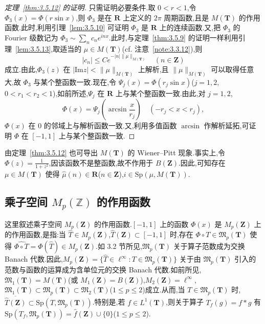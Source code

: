 \begin{proof}[定理~\ref{thm:3.5.12} 的证明]
只需证明必要条件.取 $0 < r < 1$,令 $\Phi_{3}(x) = \Phi(r\sin x)$,则 $\Phi_{3}$ 是在 $\mathbf{R}$ 上定义的 $2\pi$ 周期函数,且是 $M(\mathbf{T})$ 的作用函数.此时,利用引理~\ref{lem:3.5.10} 可证明 $\Phi_{3}$ 是 $\mathbf{R}$ 上的连续函数.又,把 $\Phi_{3}$ 的 Fourier 级数记为 $\Phi_{3} \sim \sum_{n}c_{n}e^{inx}$.此时,与定理~\ref{thm:3.5.9} 的证明一样利用引理~\ref{lem:3.5.13},取适当的 $\mu \in M(\mathbf{T})$(cf. 注意~\ref{note:3.3.12}),则
\begin{equation*}
|c_{n}| \leq Ce^{-|n|\|\mu\|_{M(\mathbf{T})}} \quad (n \in \mathbf{Z})
\end{equation*}
成立.由此,$\Phi_{3}(z)$ 在 $|\mathrm{Im}z| < \|\mu\|_{M(\mathbf{T})}$ 上解析,且 $\|\mu\|_{M(\mathbf{T})}$ 可以取得任意大,故 $\Phi_{3}$ 与某个整函数一致.现在,令 $\Psi_{j}(x) = \Phi(r_{j}\sin x)$($j = 1, 2$,$0 < r_{1} < r_{2} < 1$),如前所述,$\Psi_{j}$ 在 $\mathbf{R}$ 上与某个整函数一致.由此,对 $j = 1, 2$,
\begin{equation*}
\Phi(x) = \Psi_{j}\left(\arcsin\frac{x}{r_{j}}\right) \quad (-r_{j} < x < r_{j}),
\end{equation*}
$\Phi(x)$ 在 0 的邻域上与解析函数一致.又,利用多值函数 $\arcsin$ 作解析延拓,可证明 $\Phi$ 在 $[-1, 1]$ 上与某个整函数一致.
\end{proof}

\begin{note}\label{note:3.5.14}
由定理~\ref{thm:3.5.12} 也可导出 $M(\mathbf{T})$ 的 Wiener--Pitt 现象.事实上,令 $\Phi(z) = \frac{1}{1 + z^{2}}$,因该函数不是整函数,故不作用于 $B(\mathbf{Z})$.因此,可知存在 $\mu \in M(\mathbf{T})$ 使得 $\hat{\mu}(n) \in \mathbf{R}$($n \in \mathbf{Z}$),$i \in \mathrm{Sp}(\mu, M(\mathbf{T}))$.
\end{note}

\subsection{\texorpdfstring{乘子空间 $M_p(\mathbb{Z})$ 的作用函数}{乘子空间 M_p(Z) 的作用函数}}\label{sec:3.5.4}

这里叙述乘子空间 $M_{p}(\mathbf{Z})$ 的作用函数.$[-1, 1]$ 上的函数 $\Phi(x)$ 是 $M_{p}(\mathbf{Z})$ 上的作用函数,是指:当 $\hat{T} \in M_{p}(\mathbf{Z})$,$\hat{T}(\mathbf{Z}) \subset [-1, 1]$ 时,存在 $\Phi \circ T \in \mathfrak{M}_{p}(\mathbf{T})$ 使得 $\widehat{\Phi \circ T} = \Phi(\hat{T}) \in M_{p}(\mathbf{Z})$.如 3.2 节所见,$\mathfrak{M}_{p}(\mathbf{T})$ 关于算子范数成为交换 Banach 代数.因此,$M_{p}(\mathbf{Z}) = \{\hat{T} \in \ell^{\infty}: T \in \mathfrak{M}_{p}(\mathbf{T})\}$ 关于由 $\mathfrak{M}_{p}(\mathbf{T})$ 引入的范数与函数的运算成为含单位元的交换 Banach 代数.如前所见,$\mathfrak{M}_{1}(\mathbf{T}) = M(\mathbf{T})$(或 $M_{1}(\mathbf{Z}) = B(\mathbf{Z})$),$M_{2}(\mathbf{Z}) = \ell^{\infty}$,$\mathfrak{M}_{1}(\mathbf{T}) \subset \mathfrak{M}_{p}(\mathbf{T}) \subset \mathfrak{M}_{2}(\mathbf{T})$($1 \leq p \leq 2$)成立.从而,当 $T \in \mathfrak{M}_{p}(\mathbf{T})$ 时,$\overline{\hat{T}(\mathbf{Z})} \subset \mathrm{Sp}(T, \mathfrak{M}_{p}(\mathbf{T}))$.特别是,若 $f \in L^{1}(\mathbf{T})$,则关于算子 $T_{f}(g) = f * g$ 有 $\mathrm{Sp}(T_{f}, \mathfrak{M}_{p}(\mathbf{T})) = \hat{f}(\mathbf{Z}) \cup \{0\}$($1 \leq p \leq 2$).

